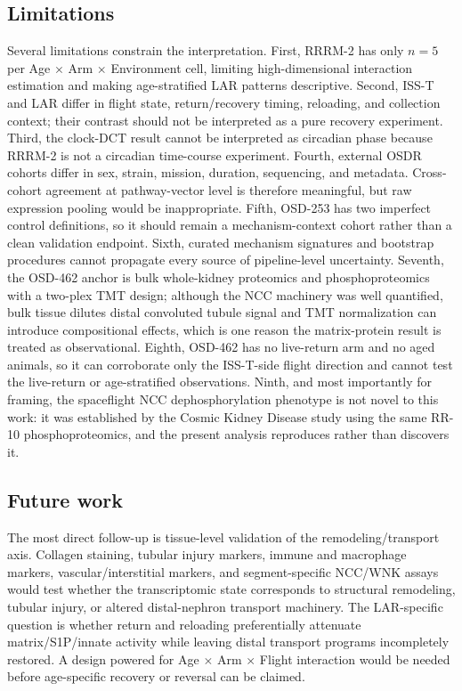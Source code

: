\documentclass[11pt]{article}
\begin{document}
\subsection{Limitations}

Several limitations constrain the interpretation. First, RRRM-2 has only $n=5$ per Age $\times$ Arm $\times$ Environment cell, limiting high-dimensional interaction estimation and making age-stratified LAR patterns descriptive. Second, ISS-T and LAR differ in flight state, return/recovery timing, reloading, and collection context; their contrast should not be interpreted as a pure recovery experiment. Third, the clock-DCT result cannot be interpreted as circadian phase because RRRM-2 is not a circadian time-course experiment. Fourth, external OSDR cohorts differ in sex, strain, mission, duration, sequencing, and metadata. Cross-cohort agreement at pathway-vector level is therefore meaningful, but raw expression pooling would be inappropriate. Fifth, OSD-253 has two imperfect control definitions, so it should remain a mechanism-context cohort rather than a clean validation endpoint. Sixth, curated mechanism signatures and bootstrap procedures cannot propagate every source of pipeline-level uncertainty. Seventh, the OSD-462 anchor is bulk whole-kidney proteomics and phosphoproteomics with a two-plex TMT design; although the NCC machinery was well quantified, bulk tissue dilutes distal convoluted tubule signal and TMT normalization can introduce compositional effects, which is one reason the matrix-protein result is treated as observational. Eighth, OSD-462 has no live-return arm and no aged animals, so it can corroborate only the ISS-T-side flight direction and cannot test the live-return or age-stratified observations. Ninth, and most importantly for framing, the spaceflight NCC dephosphorylation phenotype is not novel to this work: it was established by the Cosmic Kidney Disease study using the same RR-10 phosphoproteomics, and the present analysis reproduces rather than discovers it.

\subsection{Future work}

The most direct follow-up is tissue-level validation of the remodeling/transport axis. Collagen staining, tubular injury markers, immune and macrophage markers, vascular/interstitial markers, and segment-specific NCC/WNK assays would test whether the transcriptomic state corresponds to structural remodeling, tubular injury, or altered distal-nephron transport machinery. The LAR-specific question is whether return and reloading preferentially attenuate matrix/S1P/innate activity while leaving distal transport programs incompletely restored. A design powered for Age $\times$ Arm $\times$ Flight interaction would be needed before age-specific recovery or reversal can be claimed.
\end{document}
